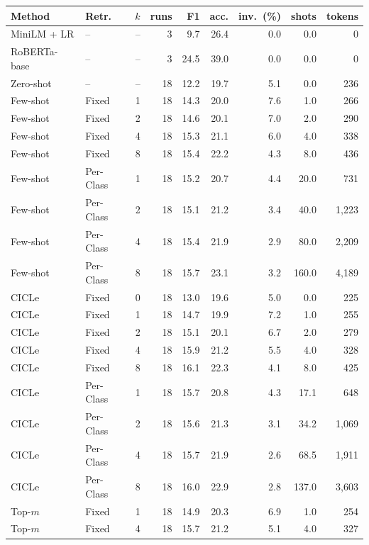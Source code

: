 \begin{tabular}{llrrrrrrr}
\toprule
Method & Retr. & $k$ & runs & F1 & acc. & inv.\ (\%) & shots & tokens \\
\midrule
MiniLM + LR & -- & -- & 3 & 9.7 & 26.4 & 0.0 & 0.0 & 0 \\
RoBERTa-base & -- & -- & 3 & 24.5 & 39.0 & 0.0 & 0.0 & 0 \\
\midrule
Zero-shot & -- & -- & 18 & 12.2 & 19.7 & 5.1 & 0.0 & 236 \\
\midrule
Few-shot & Fixed & 1 & 18 & 14.3 & 20.0 & 7.6 & 1.0 & 266 \\
Few-shot & Fixed & 2 & 18 & 14.6 & 20.1 & 7.0 & 2.0 & 290 \\
Few-shot & Fixed & 4 & 18 & 15.3 & 21.1 & 6.0 & 4.0 & 338 \\
Few-shot & Fixed & 8 & 18 & 15.4 & 22.2 & 4.3 & 8.0 & 436 \\
Few-shot & Per-Class & 1 & 18 & 15.2 & 20.7 & 4.4 & 20.0 & 731 \\
Few-shot & Per-Class & 2 & 18 & 15.1 & 21.2 & 3.4 & 40.0 & 1,223 \\
Few-shot & Per-Class & 4 & 18 & 15.4 & 21.9 & 2.9 & 80.0 & 2,209 \\
Few-shot & Per-Class & 8 & 18 & 15.7 & 23.1 & 3.2 & 160.0 & 4,189 \\
CICLe & Fixed & 0 & 18 & 13.0 & 19.6 & 5.0 & 0.0 & 225 \\
CICLe & Fixed & 1 & 18 & 14.7 & 19.9 & 7.2 & 1.0 & 255 \\
CICLe & Fixed & 2 & 18 & 15.1 & 20.1 & 6.7 & 2.0 & 279 \\
CICLe & Fixed & 4 & 18 & 15.9 & 21.2 & 5.5 & 4.0 & 328 \\
CICLe & Fixed & 8 & 18 & 16.1 & 22.3 & 4.1 & 8.0 & 425 \\
CICLe & Per-Class & 1 & 18 & 15.7 & 20.8 & 4.3 & 17.1 & 648 \\
CICLe & Per-Class & 2 & 18 & 15.6 & 21.3 & 3.1 & 34.2 & 1,069 \\
CICLe & Per-Class & 4 & 18 & 15.7 & 21.9 & 2.6 & 68.5 & 1,911 \\
CICLe & Per-Class & 8 & 18 & 16.0 & 22.9 & 2.8 & 137.0 & 3,603 \\
\midrule
Top-$m$ & Fixed & 1 & 18 & 14.9 & 20.3 & 6.9 & 1.0 & 254 \\
Top-$m$ & Fixed & 4 & 18 & 15.7 & 21.2 & 5.1 & 4.0 & 327 \\

\end{tabular}

